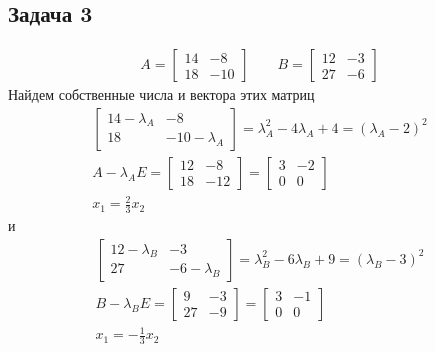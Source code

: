 \subsection*{Задача 3}
\begin{gather*}
	A = 
	\begin{bmatrix}
		14 & -8 \\ 18 & -10
	\end{bmatrix}
	\qquad
	B = 
	\begin{bmatrix}
		12 & -3 \\ 27 & -6
	\end{bmatrix}
\end{gather*}
Найдем собственные числа и вектора этих матриц
\begin{gather*}
	\begin{bmatrix}
		14 - \lambda_A & -8\\
		18 & -10-\lambda_A
	\end{bmatrix}
	= \lambda_A^2 - 4\lambda_A + 4 = (\lambda_A - 2)^2\\
	A - \lambda_A E = 
	\begin{bmatrix}
		12 & -8\\
		18 & -12
	\end{bmatrix}
	= 
	\begin{bmatrix}
		3 & -2\\
		0 & 0
	\end{bmatrix}\\
	x_1 = \frac{2}{3} x_2
\end{gather*}
и
\begin{gather*}
	\begin{bmatrix}
		12 - \lambda_B & -3\\
		27 & -6 - \lambda_B
	\end{bmatrix}
	= \lambda_B^2 - 6\lambda_B + 9 = (\lambda_B - 3)^2\\
	B - \lambda_B E = 
	\begin{bmatrix}
		9 & -3\\
		27 & -9
	\end{bmatrix}
	=
	\begin{bmatrix}
		3 & -1\\
		0 & 0
	\end{bmatrix}\\
	x_1 = -\frac{1}{3} x_2
\end{gather*}

